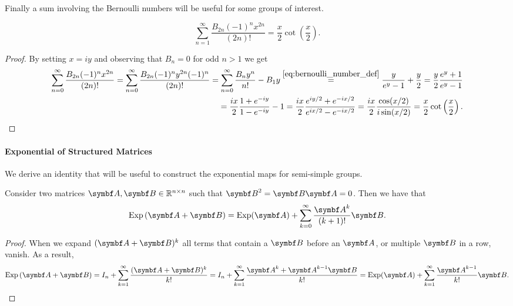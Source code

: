 Finally a sum involving the Bernoulli numbers will be useful for some groups of interest.
\begin{proposition}
  \begin{equation}
    \label{eq:bernoulli_cot}
    \sum_{n = 1}^{\infty} \frac{B_{2n} (-1)^n x^{2n}}{(2n)!} = \frac{x}{2} \cot \left(\frac{x}{2}\right).
  \end{equation}
\end{proposition}
\begin{proof}
  By setting $x = iy$ and observing that $B_n = 0$ for odd $n > 1$ we get
  \begin{equation}
    \begin{aligned}
      \sum_{n=0}^\infty \frac{B_{2n} (-1)^n x^{2n}}{(2n)!} = \sum_{n=0}^\infty \frac{B_{2n} (-1)^n y^{2n} (-1)^n}{(2n)!} = \sum_{n=0}^\infty \frac{B_n y^n}{n!} - B_1 y \overset{\eqref{eq:bernoulli_number_def}} = \frac{y}{e^y - 1} + \frac{y}{2}
      = \frac{y}{2} \frac{e^y + 1 }{e^y - 1} \\
      = \frac{ix}{2} \frac{1 + e^{-iy}}{1 - e^{-iy}} - 1 = \frac{ix}{2} \frac{e^{iy / 2} + e^{-ix/2}}{e^{ix/2} - e^{-ix/2}} = \frac{ix}{2} \frac{\cos (x / 2)}{i \sin(x / 2)} = \frac{x}{2} \cot \left( \frac{x}{2} \right).
    \end{aligned}
  \end{equation}
\end{proof}

\paragraph{Exponential of Structured Matrices}

We derive an identity that will be useful to construct the exponential maps for semi-simple groups.
\begin{lemma}
  \label{lem:help_exp}
  Consider two matrices $\A , \B \in \mathbb{R}^{n \times n}$ such that $\B^2 = \B\A = 0$. Then we have that
  \begin{equation}
    \Exp \left( \A + \B \right) = \Exp(\A) + \sum\limits_{k = 0}^\infty \frac{\A^{k}}{(k+1)!} \B.
  \end{equation}
\end{lemma}
\begin{proof}
  When we expand $(\A+\B)^k$ all terms that contain a $\B$ before an $\A$, or multiple $\B$ in a row, vanish. As a result,
  \begin{equation}
    \Exp \left( \A + \B \right) = I_n + \sum\limits_{k=1}^\infty \frac{(\A+\B)^k}{k!} = I_n + \sum\limits_{k=1}^\infty \frac{\A^k + \A^{k-1}\B }{k!} = \Exp(\A) + \sum\limits_{k=1}^\infty \frac{\A^{k-1}}{k!} \B.
  \end{equation}
\end{proof}

